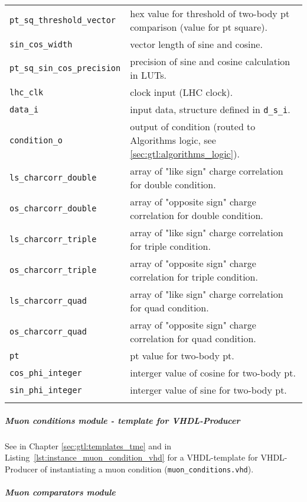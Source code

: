 \begin{longtable}{>{\footnotesize}l >{\footnotesize}p{}}
\verb|pt_sq_threshold_vector| & hex value for threshold of two-body pt comparison (value for pt square).\\
\verb|sin_cos_width| & vector length of sine and cosine.\\
\verb|pt_sq_sin_cos_precision| & precision of sine and cosine calculation in LUTs.\\
\verb|lhc_clk| & clock input (LHC clock).\\
\verb|data_i| & input data, structure defined in \texttt{d\_s\_i}.\\
\verb|condition_o| & output of condition (routed to Algorithms logic, see \ref{sec:gtl:algorithms_logic}).\\
\verb|ls_charcorr_double| & array of "like sign" charge correlation for double condition.\\
\verb|os_charcorr_double| & array of "opposite sign" charge correlation for double condition.\\
\verb|ls_charcorr_triple| & array of "like sign" charge correlation for triple condition.\\
\verb|os_charcorr_triple| & array of "opposite sign" charge correlation for triple condition.\\
\verb|ls_charcorr_quad| & array of "like sign" charge correlation for quad condition.\\
\verb|os_charcorr_quad| & array of "opposite sign" charge correlation for quad condition.\\
\verb|pt| & pt value for two-body pt.\\
\verb|cos_phi_integer| & interger value of cosine for two-body pt.\\
\verb|sin_phi_integer| & interger value of sine for two-body pt.\\
\hline 
\label{tab:gtl:explanation_muon_conditions_vhd}
\end{longtable}

\clearpage

\subparagraph{Muon conditions module - template for VHDL-Producer}
See in Chapter \ref{sec:gtl:templates_tme} and in Listing~\ref{lst:instance_muon_condition_vhd} for a VHDL-template for VHDL-Producer of instantiating a muon condition (\texttt{muon\_conditions.vhd}).\\

\subparagraph{Muon comparators module}
\label{sec:gtl:muon_comp_module}

